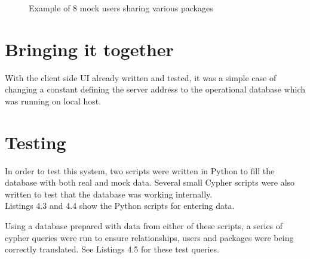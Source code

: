 \documentclass{l4proj}
\begin{document}
\begin{figure}
\caption{Example of 8 mock users sharing various packages}
\end{figure}

\section{Bringing it together}
With the client side UI already written and tested, it was a simple case of changing a constant defining the server address to the operational database which was running on local host.

\section{Testing}
In order to test this system, two scripts were written in Python to fill the database with both real and mock data. Several small Cypher scripts were also written to test that the database was working internally.\\
Listings 4.3 and 4.4 show the Python scripts for entering data.\\
\begin{figure}

\end{figure}
\begin{figure}

\end{figure}
Using a database prepared with data from either of these scripts, a series of cypher queries were run to ensure relationships, users and packages were being correctly translated. See Listings 4.5 for these test queries.
\begin{figure}

\end{figure}
 
\end{document}
